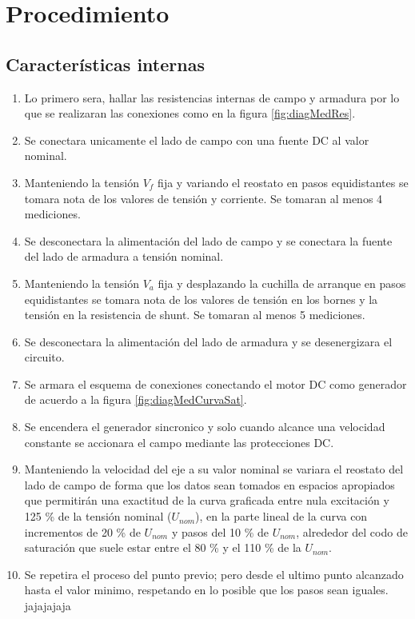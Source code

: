 \documentclass[11pt,letterpaper]{article}     %
\begin{document}
\section{Procedimiento}
\subsection{Características internas}
\begin{enumerate}
    \item Lo primero sera, hallar las resistencias internas de campo y armadura por lo que se realizaran las conexiones como en la figura \ref{fig:diagMedRes}.
    \item Se conectara unicamente el lado de campo con una fuente DC al valor nominal.
    \item Manteniendo la tensión $V_{f}$ fija y variando el reostato en pasos equidistantes se tomara nota de los valores de tensión y corriente. Se tomaran al menos 4 mediciones.
    \item Se desconectara la alimentación del lado de campo y se conectara la fuente del lado de armadura a tensión nominal.
    \item Manteniendo la tensión $V_{a}$ fija y desplazando la cuchilla de arranque en pasos equidistantes se tomara nota de los valores de tensión en los bornes y la tensión en la resistencia de shunt. Se tomaran al menos 5 mediciones.
    \item Se desconectara la alimentación del lado de armadura y se desenergizara el circuito.
    \item Se armara el esquema de conexiones conectando el motor DC como generador de acuerdo a la figura \ref{fig:diagMedCurvaSat}.
    \item Se encendera el generador sincronico y solo cuando alcance una velocidad constante se accionara el campo mediante las protecciones DC.
    \item Manteniendo la velocidad del eje a su valor nominal se variara el reostato del lado de campo de forma que los datos sean tomados en espacios apropiados que permitirán una exactitud de la curva graficada entre nula excitación y 125 \% de la tensión nominal ($U_{nom}$), en la parte lineal de la curva con incrementos de 20 \% de $U_{nom}$ y pasos del 10 \% de $U_{nom}$,
    alrededor del codo de saturación que suele estar entre el 80 \% y el 110 \% de la $U_{nom}$.  
    \item Se repetira el proceso del punto previo; pero desde el ultimo punto alcanzado hasta el valor minimo, respetando en lo posible que los pasos sean iguales. jajajajaja
\end{enumerate}
\end{document}

